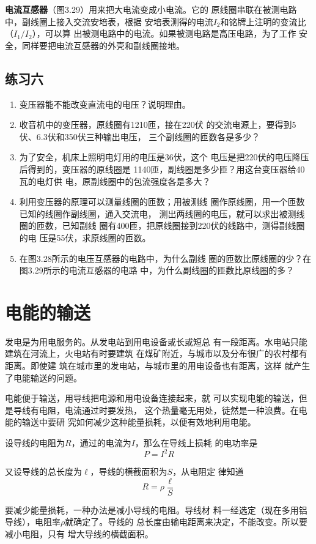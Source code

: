 \textbf{电流互感器}（图3.29）用来把大电流变成小电流。它的
原线圈串联在被测电路中，副线圈上接入交流安培表，根据
安培表测得的电流$I_2$和铭牌上注明的变流比（$I_1/I_2$），可以算
出被测电路中的电流。如果被测电路是高压电路，为了工作
安全，同样要把电流互感器的外壳和副线圈接地。

\subsection*{练习六}
\begin{enumerate}
    \item 变压器能不能改变直流电的电压？说明理由。
    \item 收音机中的变压器，原线圈有1210匝，接在220伏
的交流电源上，要得到5伏、6.3伏和350伏三种输出电压，
三个副线圈的匝数各是多少？
\item 为了安全，机床上照明电灯用的电压是36伏，这个
电压是把220伏的电压降压后得到的，变压器的原线圈是
1140匝，副线圈是多少匝？用这台变压器给40瓦的电灯供
电，原副线圈中的包流强度各是多大？
\item 利用变压器的原理可以测量线圈的匝数；用被测线
圈作原线圈，用一个匝数已知的线圈作副线圈，通入交流电，
测出两线圈的电压，就可以求出被测线圈的匝数，已知副线
圈有400匝，把原线圈接到220伏的线路中，测得副线圈的电
压是55伏，求原线圈的匝数。
\item 在图3.28所示的电压互感器的电路中，为什么副线
圈的匝数比原线圈的少？在图3.29所示的电流互感器的电路
中，为什么副线圈的匝数比原线圈的多？
\end{enumerate}

\section{电能的输送}
发电是为用电服务的。从发电站到用电设备或长或短总
有一段距离。水电站只能建筑在河流上，火电站有时要建筑
在煤矿附近，与城市以及分布很广的农村都有距离。即使建
筑在城市里的发电站，与城市里的用电设备也有距离，这样
就产生了电能输送的问题。

电能便于输送，用导线把电源和用电设备连接起来，就
可以实现电能的输送，但是导线有电阻，电流通过时要发热，
这个热量毫无用处，徒然是一种浪费。在电能的输送中要研
究如何减少这种能量损耗，以便有效地利用电能。

设导线的电阻为$R$，通过的电流为$I$，那么在导线上损耗
的电功率是
\[P=I^2R \]

又设导线的总长度为$\ell$，导线的横截面积为$S$，从电阻定
律知道
\[ R=\rho\frac{\ell}{S}\]

要减少能量损耗，一种办法是减小导线的电阻。导线材
料一经选定（现在多用铝导线），电阻率$\rho$就确定了。导线的
总长度由输电距离来决定，不能改变。所以要减小电阻，只有
增大导线的横截面积。

